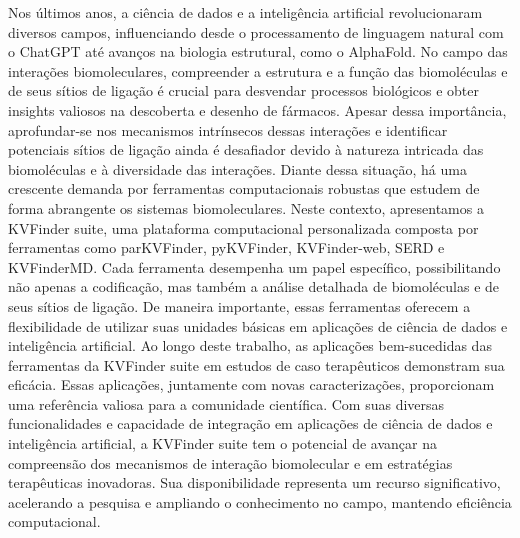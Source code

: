 \documentclass[Ingles]{phdthesis}
\begin{document}
\begin{resumo}

Nos últimos anos, a ciência de dados e a inteligência artificial revolucionaram diversos campos, influenciando desde o processamento de linguagem natural com o ChatGPT até avanços na biologia estrutural, como o AlphaFold. No campo das interações biomoleculares, compreender a estrutura e a função das biomoléculas e de seus sítios de ligação é crucial para desvendar processos biológicos e obter insights valiosos na descoberta e desenho de fármacos. Apesar dessa importância, aprofundar-se nos mecanismos intrínsecos dessas interações e identificar potenciais sítios de ligação ainda é desafiador devido à natureza intricada das biomoléculas e à diversidade das interações. Diante dessa situação, há uma crescente demanda por ferramentas computacionais robustas que estudem de forma abrangente os sistemas biomoleculares. Neste contexto, apresentamos a KVFinder suite, uma plataforma computacional personalizada composta por ferramentas como parKVFinder, pyKVFinder, KVFinder-web, SERD e KVFinderMD. Cada ferramenta desempenha um papel específico, possibilitando não apenas a codificação, mas também a análise detalhada de biomoléculas e de seus sítios de ligação. De maneira importante, essas ferramentas oferecem a flexibilidade de utilizar suas unidades básicas em aplicações de ciência de dados e inteligência artificial. Ao longo deste trabalho, as aplicações bem-sucedidas das ferramentas da KVFinder suite em estudos de caso terapêuticos demonstram sua eficácia. Essas aplicações, juntamente com novas caracterizações, proporcionam uma referência valiosa para a comunidade científica. Com suas diversas funcionalidades e capacidade de integração em aplicações de ciência de dados e inteligência artificial, a KVFinder suite tem o potencial de avançar na compreensão dos mecanismos de interação biomolecular e em estratégias terapêuticas inovadoras. Sua disponibilidade representa um recurso significativo, acelerando a pesquisa e ampliando o conhecimento no campo, mantendo eficiência computacional.

\end{resumo}
\end{document}
